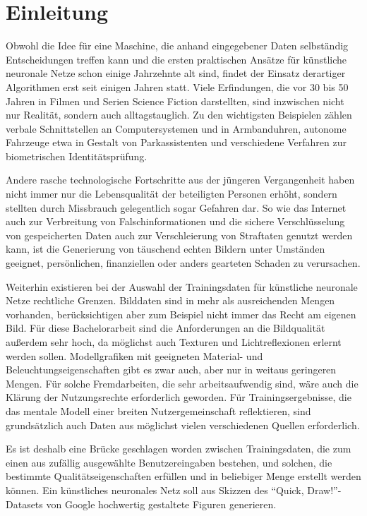 \chapter{Einleitung}
\label{ch:einleitung}
Obwohl die Idee für eine Maschine, die anhand eingegebener Daten selbständig Entscheidungen treffen kann und die ersten praktischen Ansätze für künstliche neuronale Netze schon einige Jahrzehnte alt sind, findet der Einsatz derartiger Algorithmen erst seit einigen Jahren statt. Viele Erfindungen, die vor 30 bis 50 Jahren in Filmen und Serien Science Fiction darstellten, sind inzwischen nicht nur Realität, sondern auch alltagstauglich. Zu den wichtigsten Beispielen zählen verbale Schnittstellen an Computersystemen und in Armbanduhren, autonome Fahrzeuge etwa in Gestalt von Parkassistenten und verschiedene Verfahren zur biometrischen Identitätsprüfung.

Andere rasche technologische Fortschritte aus der jüngeren Vergangenheit haben nicht immer nur die Lebensqualität der beteiligten Personen erhöht, sondern stellten durch Missbrauch gelegentlich sogar Gefahren dar. So wie das Internet auch zur Verbreitung von Falschinformationen und die sichere Verschlüsselung von gespeicherten Daten auch zur Verschleierung von Straftaten genutzt werden kann, ist die Generierung von täuschend echten Bildern unter Umständen geeignet, persönlichen, finanziellen oder anders gearteten Schaden zu verursachen.

Weiterhin existieren bei der Auswahl der Trainingsdaten für künstliche neuronale Netze rechtliche Grenzen. Bilddaten sind in mehr als ausreichenden Mengen vorhanden, berücksichtigen aber zum Beispiel nicht immer das Recht am eigenen Bild. Für diese Bachelorarbeit sind die Anforderungen an die Bildqualität außerdem sehr hoch, da möglichst auch Texturen und Lichtreflexionen erlernt werden sollen. Modellgrafiken mit geeigneten Material- und Beleuchtungseigenschaften gibt es zwar auch, aber nur in weitaus geringeren Mengen. Für solche Fremdarbeiten, die sehr arbeitsaufwendig sind, wäre auch die Klärung der Nutzungsrechte erforderlich geworden. Für Trainingsergebnisse, die das mentale Modell einer breiten Nutzergemeinschaft reflektieren, sind grundsätzlich auch Daten aus möglichst vielen verschiedenen Quellen erforderlich.

Es ist deshalb eine Brücke geschlagen worden zwischen Trainingsdaten, die zum einen aus zufällig ausgewählte Benutzereingaben bestehen, und solchen, die bestimmte Qualitätseigenschaften erfüllen und in beliebiger Menge erstellt werden können. Ein künstliches neuronales Netz soll aus Skizzen des ``Quick, Draw!''-Datasets von Google hochwertig gestaltete Figuren generieren.

